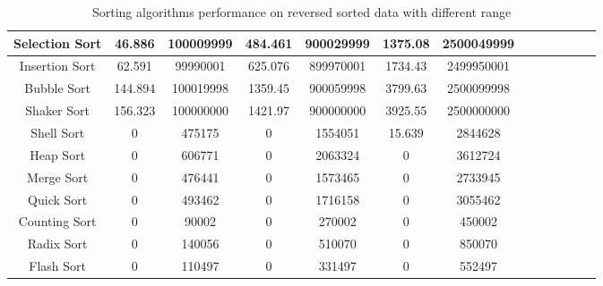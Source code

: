 \documentclass[11pt,a4paper]{article}
\begin{document}
{\begin{table}[H]
{\begin{tabular}{|c|c|c|c|c|c|c|c|c|c|c|c|c|}
		 \hline
		 Selection Sort & 46.886 & 100009999 & 484.461 & 900029999 & 1375.08 & 2500049999\\
		 \hline
		 Insertion Sort & 62.591 & 99990001 & 625.076 & 899970001 & 1734.43 & 2499950001\\
		 \hline
		 Bubble Sort 	& 144.894 & 100019998 & 1359.45 & 900059998 & 3799.63 & 2500099998\\
		 \hline
		 Shaker Sort 	& 156.323 & 100000000 & 1421.97 & 900000000 & 3925.55 & 2500000000\\
		 \hline
		 Shell Sort		& 0 & 475175 & 0 & 1554051 & 15.639 & 2844628\\
		 \hline
		 Heap Sort		& 0 & 606771 & 0 & 2063324 & 0 & 3612724\\
		 \hline
		 Merge Sort		& 0 & 476441 & 0 & 1573465 & 0 & 2733945\\
		 \hline
		 Quick Sort		& 0 & 493462 & 0 & 1716158 & 0 & 3055462\\
		 \hline
		 Counting Sort 	& 0 & 90002 & 0 & 270002 & 0 & 450002\\
		 \hline
		 Radix Sort 	& 0 & 140056 & 0 & 510070 & 0 & 850070\\
		 \hline
		 Flash Sort 	& 0 & 110497 & 0 & 331497 & 0 & 552497\\
		 \hline
			\end{tabular}}
		\caption{Sorting algorithms performance on reversed sorted data with different range}
		\end{table}
		
}
\end{document}
